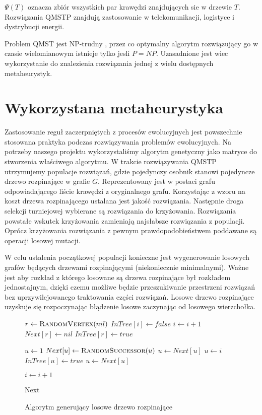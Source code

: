 \documentclass[12pt]{article}
\begin{document}
 $\Psi (T)$ oznacza zbiór wszystkich par krawędzi znajdujących sie w drzewie $T$. Rozwiązania QMSTP znajdują zastosowanie w telekomunikacji, logistyce i dystrybucji energii.
 
 Problem QMST jest NP-trudny \cite{Assad}, przez co optymalny algorytm rozwiązujący go w czasie wielomianowym istnieje tylko jesli $P=NP$. Uzasadnione jest wiec wykorzystanie do znalezienia rozwiązania jednej z wielu dostępnych metaheurystyk.
 
 \section{Wykorzystana metaheurystyka}

Zastosowanie reguł zaczerpniętych z procesów ewolucyjnych jest powszechnie stosowana praktyka podczas rozwiązywania problemów ewolucyjnych. Na potrzeby naszego projektu wykorzystaliśmy algorytm genetyczny jako matryce do stworzenia właściwego algorytmu. W trakcie rozwiązywania QMSTP utrzymujemy populacje rozwiązań, gdzie pojedynczy osobnik stanowi pojedyncze drzewo rozpinające w grafie $G$. Reprezentowany jest w postaci grafu odpowiadającego liście krawędzi z oryginalnego grafu. Korzystając z wzoru na koszt drzewa rozpinającego ustalana jest jakość rozwiązania. Następnie droga selekcji turniejowej wybierane są rozwiązania do krzyżowania. Rozwiązania powstałe wskutek krzyżowania zamieniają najsłabsze rozwiązania z populacji. Oprócz krzyżowania rozwiązania z pewnym prawdopodobieństwem poddawane są operacji losowej mutacji.


W celu ustalenia początkowej populacji konieczne jest wygenerowanie losowych grafów będących drzewami rozpinającymi (niekoniecznie minimalnymi). Ważne jest aby rozkład z którego losowane są drzewa rozpinające był rozkładem jednostajnym, dzięki czemu możliwe będzie przeszukiwanie przestrzeni rozwiązań bez uprzywilejowanego traktowania części rozwiązań. Losowe drzewo rozpinające uzyskuje się rozpoczynając błądzenie losowe zaczynając od losowego wierzchołka.

\begin{figure}[h!]
 \centering
\begin{algorithmic}
\State $r\gets \Call{RandomVertex}{nil}$
    \State $InTree[i] \gets false $
    \State $i\gets i+1$
\EndFor
\State $Next[r] \gets nil $
\State $InTree[r] \gets true $


    \State $u \gets 1 $
        \State $Next[u] \gets \Call{RandomSuccessor}{u}$
        \State $u \gets Next[u]$
    \EndWhile
    \State $u\gets i$
        \State $InTree[u] \gets true$
        \State $u \gets Next[u]$
    \EndWhile
   
    \State $i\gets i+1$
\EndFor


\Return Next

\EndFunction

\end{algorithmic}
\caption{Algorytm generujący losowe drzewo rozpinające}
\end{figure}
\end{document}
